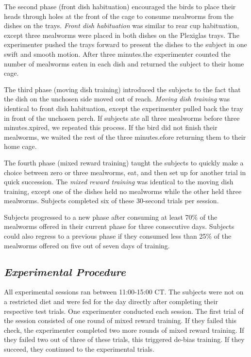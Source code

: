 \documentclass[
  ,pub,floatsintext]{apa6}
\begin{document}
The second phase (front dish habituation) encouraged the birds to place their heads through holes at the front of the cage to consume mealworms from the dishes on the trays. \emph{Front dish habituation} was similar to rear cup habituation, except three mealworms were placed in both dishes on the Plexiglas trays. The experimenter pushed the trays forward to present the dishes to the subject in one swift and smooth motion. After three minutes.the experimenter counted the number of mealworms eaten in each dish and returned the subject to their home cage.

The third phase (moving dish training) introduced the subjects to the fact that the dish on the unchosen side moved out of reach. \emph{Moving dish training} was identical to front dish habituation, except the experimenter pulled back the tray in front of the unchosen perch. If subjects ate all three mealworms before three minutes.xpired, we repeated this process. If the bird did not finish their mealworms, we waited the rest of the three minutes.efore returning them to their home cage.

The fourth phase (mixed reward training) taught the subjects to quickly make a choice between zero or three mealworms, eat, and then set up for another trial in quick succession. The \emph{mixed reward training} was identical to the moving dish training, except one of the dishes held no mealworms while the other held three mealworms. Subjects completed six of these 30-second trials per session.

Subjects progressed to a new phase after consuming at least 70\% of the mealworms offered in their current phase for three consecutive days. Subjects could also regress to a previous phase if they consumed less than 25\% of the mealworms offered on five out of seven days of training.

\hypertarget{experimental-procedure}{%
\subsection{\texorpdfstring{\emph{Experimental Procedure}}{Experimental Procedure}}\label{experimental-procedure}}

All experimental sessions ran between 11:00-15:00 CT. The subjects were not on a restricted diet and were fed for the day directly after completing their respective test trials. One experimenter conducted each session. The first trial of the session consisted of one round of mixed reward training. If they failed this check, the experimenter completed two more rounds of mixed reward training. If they failed two out of three of these trials, this triggered de-bias training. If they succeed, they continued to the experimental trials.
\end{document}

